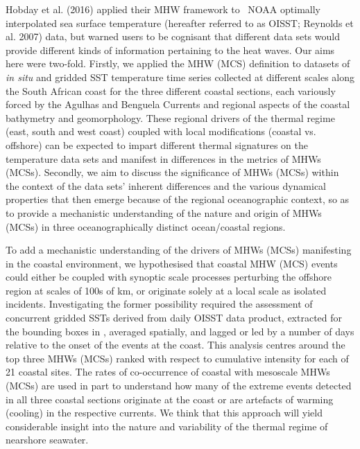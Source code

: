 \documentclass[a4paper,10pt,review]{elsarticle}
\begin{document}
Hobday et al. (2016) applied their MHW framework to \degree~NOAA optimally interpolated sea surface temperature (hereafter referred to as OISST; Reynolds et al. 2007) data, but warned users to be cognisant that different data sets would provide different kinds of information pertaining to the heat waves. Our aims here were two-fold. Firstly, we applied the MHW (MCS) definition to datasets of \emph{in situ} and gridded SST temperature time series collected at different scales along the South African coast for the three different coastal sections, each variously forced by the Agulhas and Benguela Currents and regional aspects of the coastal bathymetry and geomorphology. These regional drivers of the thermal regime (east, south and west coast) coupled with local modifications (coastal vs. offshore) can be expected to impart different thermal signatures on the temperature data sets and manifest in differences in the metrics of MHWs (MCSs). Secondly, we aim to discuss the significance of MHWs (MCSs) within the context of the data sets’ inherent differences and the various dynamical properties that then emerge because of the regional oceanographic context, so as to provide a mechanistic understanding of the nature and origin of MHWs (MCSs) in three oceanographically distinct ocean/coastal regions.

To add a mechanistic understanding of the drivers of MHWs (MCSs) manifesting in the coastal environment, we hypothesised that coastal MHW (MCS) events could either be coupled with synoptic scale processes perturbing the offshore region at scales of 100s of km, or originate solely at a local scale as isolated incidents. Investigating the former possibility required the assessment of concurrent gridded SSTs derived from daily OISST data product, extracted for the bounding boxes in , averaged spatially, and lagged or led by a number of days relative to the onset of the events at the coast. This analysis centres around the top three MHWs (MCSs) ranked with respect to cumulative intensity for each of 21 coastal sites. The rates of co-occurrence of coastal with mesoscale MHWs (MCSs) are used in part to understand how many of the extreme events detected in all three coastal sections originate at the coast or are artefacts of warming (cooling) in the respective currents. We think that this approach will yield considerable insight into the nature and variability of the thermal regime of nearshore seawater.
\end{document}
